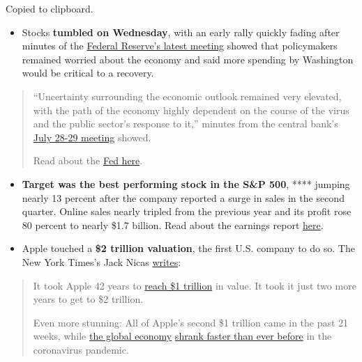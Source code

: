 Copied to clipboard.

\begin{itemize}
\tightlist
\item
  Stocks \textbf{tumbled on Wednesday}, with an early rally quickly
  fading after minutes of the
  \href{https://www.nytimes3xbfgragh.onion/2020/08/19/business/economy/fed-meeting-minutes-coronavirus.html}{Federal
  Reserve's latest meeting} showed that policymakers remained worried
  about the economy and said more spending by Washington would be
  critical to a recovery.
\end{itemize}

\begin{quote}
``Uncertainty surrounding the economic outlook remained very elevated,
with the path of the economy highly dependent on the course of the virus
and the public sector's response to it,'' minutes from the central
bank's
\href{https://www.federalreserve.gov/monetarypolicy/fomccalendars.htm}{July
28-29 meeting} showed.

Read about the
\href{https://www.nytimes3xbfgragh.onion/2020/08/19/business/economy/fed-meeting-minutes-coronavirus.html}{Fed
here}.
\end{quote}

\begin{itemize}
\item
  \textbf{Target was the best performing stock in the S\&P 500}, ****
  jumping nearly 13 percent after the company reported a surge in sales
  in the second quarter. Online sales nearly tripled from the previous
  year and its profit rose 80 percent to nearly \$1.7 billion. Read
  about the earnings report
  \href{https://www.nytimes3xbfgragh.onion/live/2020/08/19/business/stock-market-today-coronavirus/target-profits-surge-as-online-sales-nearly-triple}{here}.
\item
  Apple touched a \textbf{\$2 trillion valuation}, the first U.S.
  company to do so. The New York Times's Jack Nicas
  \href{https://www.nytimes3xbfgragh.onion/2020/08/19/technology/apple-2-trillion.html}{writes}:
\end{itemize}

\begin{quote}
It took Apple 42 years to
\href{https://www.nytimes3xbfgragh.onion/2018/08/02/technology/apple-stock-1-trillion-market-cap.html}{reach
\$1 trillion} in value. It took it just two more years to get to \$2
trillion.

Even more stunning: All of Apple's second \$1 trillion came in the past
21 weeks, while
\href{https://www.nytimes3xbfgragh.onion/live/2020/07/31/business/stock-market-today-coronavirus/europes-contraction-is-its-worst-on-record}{the
global economy}
\href{https://www.nytimes3xbfgragh.onion/2020/07/30/business/economy/q2-gdp-coronavirus-economy.html}{shrank
faster than ever before} in the coronavirus pandemic.
\end{quote}

